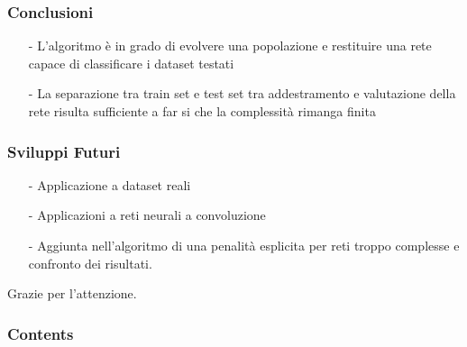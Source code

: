 \documentclass{beamer}
\begin{document}
\begin{frame}
 \frametitle{Conclusioni}
 \begin{enumerate}
  \item [-] L'algoritmo è in grado di evolvere una popolazione e restituire una rete capace di classificare i dataset testati
  \item [-] La separazione tra train set e test set tra addestramento e valutazione della rete risulta sufficiente a far si che la complessità rimanga finita
 \end{enumerate}

\end{frame}

\begin{frame}
 \large
 \frametitle{Sviluppi Futuri}
 \begin{enumerate}
  \item [-] Applicazione a dataset reali
  \item [-] Applicazioni a reti neurali a convoluzione
  \item [-] Aggiunta nell'algoritmo di una penalità esplicita per reti troppo complesse e confronto dei risultati.
 \end{enumerate}

\end{frame}

\begin{frame}
\centering
 \huge Grazie per l'attenzione.
\end{frame}

\begin{frame}
 
\end{frame}

\begin{frame}
 \frametitle{Contents }
\end{frame}
\end{document}
